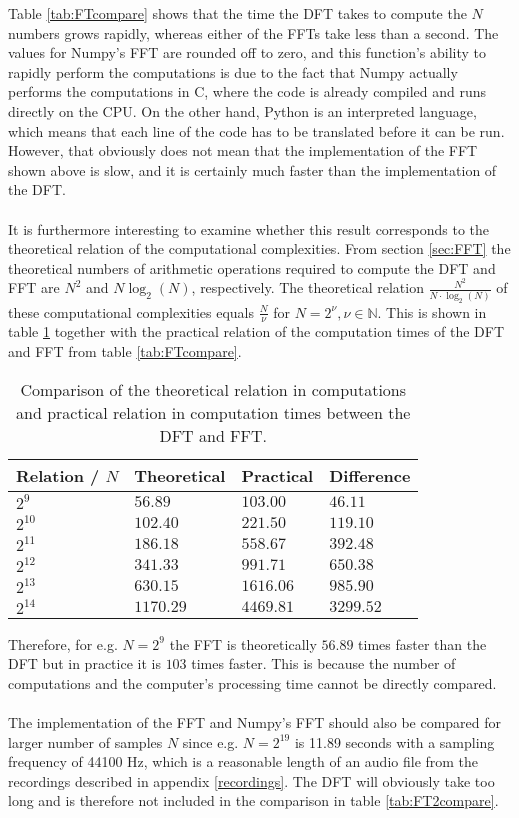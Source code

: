 Table \ref{tab:FTcompare} shows that the time the DFT takes to compute the $N$ numbers grows rapidly, whereas either of the FFTs take less than a second. The values for Numpy's FFT are rounded off to zero, and this function's ability to rapidly perform the computations is due to the fact that Numpy actually performs the computations in C, where the code is already compiled and runs directly on the CPU. On the other hand, Python is an interpreted language, which means that each line of the code has to be translated before it can be run. However, that obviously does not mean that the implementation of the FFT shown above is slow, and it is certainly much faster than the implementation of the DFT.
\\ \\
It is furthermore interesting to examine whether this result corresponds to the theoretical relation of the computational complexities. From section \ref{sec:FFT} the theoretical numbers of arithmetic operations required to compute the DFT and FFT are $N^2$ and $N\log_2(N)$, respectively. The theoretical relation $\frac{N^2}{N \cdot \log_2(N)}$ of these computational complexities equals $\frac{N}{\nu}$ for $N = 2^\nu, \nu \in \mathbb{N}$. This is shown in table \ref{tab:com_compare} together with the practical relation of the computation times of the DFT and FFT from table \ref{tab:FTcompare}.

\begin{table}[H]
\centering
\begin{tabular}{|l|l|l|l|}
\hline
Relation / $N$	& Theoretical 	& Practical	& Difference		\\ \hline
$2^9$  	   		& $56.89$    	& $103.00$	& $46.11$	\\ \hline
$2^{10}$   		& $102.40$    	& $221.50$	& $119.10$	\\ \hline
$2^{11}$   		& $186.18$   	& $558.67$	& $392.48$	\\ \hline
$2^{12}$   		& $341.33$   	& $991.71$	& $650.38$	\\ \hline
$2^{13}$   		& $630.15$  	& $1616.06$	& $985.90$	\\ \hline
$2^{14}$   		& $1170.29$ 	& $4469.81$	& $3299.52$	\\ \hline
\end{tabular}
\caption{Comparison of the theoretical relation in computations and practical relation in computation times between the DFT and FFT.}
\label{tab:com_compare}
\end{table}

Therefore, for e.g. $N = 2^9$ the FFT is theoretically $56.89$ times faster than the DFT but in practice it is $103$ times faster. This is because the number of computations and the computer's processing time cannot be directly compared.
\\ \\
The implementation of the FFT and Numpy's FFT should also be compared for larger number of samples $N$ since e.g. $N = 2^{19}$ is 11.89 seconds with a sampling frequency of 44100 Hz, which is a reasonable length of an audio file from the recordings described in appendix \ref{recordings}. The DFT will obviously take too long and is therefore not included in the comparison in table \ref{tab:FT2compare}.

